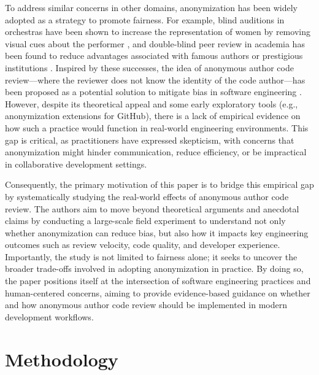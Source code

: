 To address similar concerns in other domains, anonymization has been widely adopted as a strategy to promote fairness. For example, blind auditions in orchestras have been shown to increase the representation of women by removing visual cues about the performer \cite{goldin2000orchestrating}, and double-blind peer review in academia has been found to reduce advantages associated with famous authors or prestigious institutions \cite{tomkins2017reviewer}. Inspired by these successes, the idea of anonymous author code review—where the reviewer does not know the identity of the code author—has been proposed as a potential solution to mitigate bias in software engineering \cite{kim2018lean}. However, despite its theoretical appeal and some early exploratory tools (e.g., anonymization extensions for GitHub), there is a lack of empirical evidence on how such a practice would function in real-world engineering environments. This gap is critical, as practitioners have expressed skepticism, with concerns that anonymization might hinder communication, reduce efficiency, or be impractical in collaborative development settings.

Consequently, the primary motivation of this paper is to bridge this empirical gap by systematically studying the real-world effects of anonymous author code review. The authors aim to move beyond theoretical arguments and anecdotal claims by conducting a large-scale field experiment to understand not only whether anonymization can reduce bias, but also how it impacts key engineering outcomes such as review velocity, code quality, and developer experience. Importantly, the study is not limited to fairness alone; it seeks to uncover the broader trade-offs involved in adopting anonymization in practice. By doing so, the paper positions itself at the intersection of software engineering practices and human-centered concerns, aiming to provide evidence-based guidance on whether and how anonymous author code review should be implemented in modern development workflows.

\section{Methodology}
